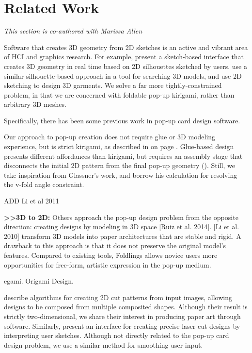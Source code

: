 \section{Related Work}\label{related-work}

\emph{This section is co-authored with Marissa Allen}

Software that creates 3D geometry from 2D sketches is an active and
vibrant area of HCI and graphics research. For example,
\citet{igarashi2007teddy} present a sketch-based interface that creates
3D geometry in real time based on 2D silhouettes sketched by users.
\citet{patrick20022d} use a similar silhouette-based approach in a tool
for searching 3D models, and \citet{wang2003feature} use 2D sketching to
design 3D garments. We solve a far more tightly-constrained problem, in
that we are concerned with foldable pop-up kirigami, rather than
arbitrary 3D meshes.

Specifically, there has been some previous work in pop-up card design
software.

Our approach to pop-up creation does not require glue or 3D modeling
experience, but is strict kirigami, as described in 
on page \pageref{background}. Glue-based design presents different
affordances than kirigami, but requires an assembly stage that
disconnects the initial 2D pattern from the final pop-up geometry
(\citet{glassner1998interactive}). Still, we take inspiration from
Glassner's work, and borrow his calculation for resolving the v-fold
angle constraint.

ADD Li et al 2011

\textbf{\textgreater{}\textgreater{}3D to 2D:} Others approach the
pop-up design problem from the opposite direction: creating designs by
modeling in 3D space {[}Ruiz et al. 2014{]}. {[}Li et al. 2010{]}
transform 3D models into paper architectures that are stable and rigid.
A drawback to this approach is that it does not preserve the original
model's features. Compared to existing tools, Foldlings allows novice
users more opportunities for free-form, artistic expression in the
pop-up medium.

egami. Origami Design. \citet{fastag2009egami}

\citet{xu2007computer} describe algorithms for creating 2D cut patterns
from input images, allowing designs to be composed from multiple
composited shapes. Although their result is strictly two-dimensional, we
share their interest in producing paper art through software. Similarly,
\citet{johnson2012sketch} present an interface for creating precise
laser-cut designs by interpreting user sketches. Although not directly
related to the pop-up card design problem, we use a similar method for
smoothing user input.

